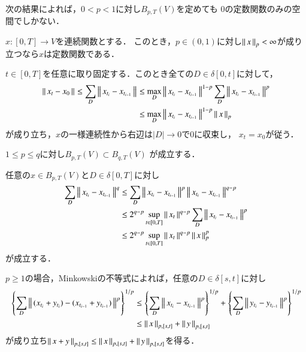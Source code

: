 次の結果によれば，$0 < p < 1$に対し$B_{p,T}(V)$を定めても
$0$の定数関数のみの空間でしかない．
\begin{screen}
	\begin{thm}
		$x:[0,T] \longrightarrow V$を連続関数とする．
		このとき，$p \in (0, 1)$に対し$\left\|\, x\, \right\|_{p} < \infty$が成り立つなら$x$は定数関数である．
	\end{thm}
\end{screen}

\begin{prf}
	$t \in [0,T]$を任意に取り固定する．このとき全ての$D \in \delta[0,t]$に対して，
	\begin{align}
		\left\|\, x_t - x_0\, \right\|_{} \leq \sum_D \left\|\, x_{t_i} - x_{t_{i-1}}\, \right\|_{}
		&\leq \operatorname*{max}_{D} \left\|\, x_{t_i} - x_{t_{i-1}}\, \right\|_{}^{1-p} 
			\sum_D \left\|\, x_{t_i} - x_{t_{i-1}}\, \right\|_{}^p \\
		&\leq \operatorname*{max}_{D} \left\|\, x_{t_i} - x_{t_{i-1}}\, \right\|_{}^{1-p} \left\|\, x\, \right\|_{p}
	\end{align}
	が成り立ち，$x$の一様連続性から右辺は$|D| \longrightarrow 0$で$0$に収束し，
	$x_t = x_0$が従う．
	\QED
\end{prf}

\begin{screen}
	\begin{thm}
		$1 \leq p \leq q$に対し$B_{p,T}(V) \subset B_{q,T}(V)$
		が成立する．
	\end{thm}
\end{screen}

\begin{prf}
	任意の$x \in B_{p,T}(V)$と$D \in \delta[0,T]$に対し
	\begin{align}
		\sum_D \left\|\, x_{t_i} - x_{t_{i-1}}\, \right\|_{}^q
		&\leq \sum_D \left\|\, x_{t_i} - x_{t_{i-1}}\, \right\|_{}^p \left\|\, x_{t_i} - x_{t_{i-1}}\, \right\|_{}^{q-p} \\
		&\leq 2^{q-p}\operatorname*{sup}_{t \in [0,T]} \left\|\, x_t\, \right\|_{}^{q-p} \sum_D \left\|\, x_{t_i} - x_{t_{i-1}}\, \right\|_{}^p \\
		&\leq 2^{q-p}\operatorname*{sup}_{t \in [0,T]} \left\|\, x_t\, \right\|_{}^{q-p} \left\|\, x\, \right\|_{p}^p
	\end{align}
	が成立する．
	\QED
\end{prf}

$p \geq 1$の場合，Minkowskiの不等式によれば，任意の$D \in \delta[s,t]$に対し
\begin{align}
	\left\{ \sum_D \left\|\, (x_{t_i} + y_{t_i}) - (x_{t_{i-1}} + y_{t_{i-1}})\, \right\|_{}^p \right\}^{1/p}
	&\leq \left\{ \sum_D \left\|\, x_{t_i} - x_{t_{i-1}}\, \right\|_{}^p \right\}^{1/p}
		+ \left\{ \sum_D \left\|\, y_{t_i} - y_{t_{i-1}}\, \right\|_{}^p \right\}^{1/p} \\
	&\leq \left\|\, x\, \right\|_{p,[s,t]} + \left\|\, y\, \right\|_{p,[s,t]}
\end{align}
が成り立ち$\left\|\, x + y\, \right\|_{p,[s,t]} \leq \left\|\, x\, \right\|_{p,[s,t]} + \left\|\, y\, \right\|_{p,[s,t]}$を得る．

